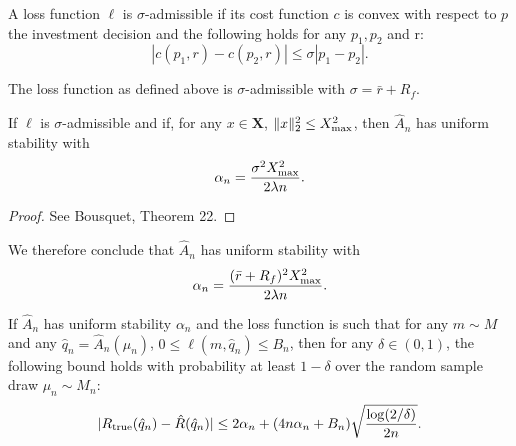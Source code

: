 \documentclass[11pt]{article}
\begin{document}
\begin{deff}
  A loss function $\ell$ is $\sigma$-admissible if its cost function $c$ is convex with
  respect to $p$ the investment decision and the following holds for any $p_1,p_2$ and r:
  \begin{equation*}
    |c(p_1,r) - c(p_2,r)| \leq \sigma|p_1-p_2|.
  \end{equation*}
\end{deff}

\begin{rem}
  The loss function as defined above is $\sigma$-admissible with $\sigma=\bar r+R_f$.
\end{rem}

\begin{thm}
  If $\ell$ is $\sigma$-admissible and if, for any $x\in\bm X$, $\|x\|_2^2\leq X_{\max}^2$,
  then $\hat A_n$ has uniform stability with
  \begin{equation*}
    \alpha_n = \frac{\sigma^2 X_{\max}^2}{2\lambda n}.
  \end{equation*}
\end{thm}

\begin{proof}
  See Bousquet, Theorem 22. 
\end{proof}

We therefore conclude that $\hat A_n$ has uniform stability with
\begin{equation*}
  \alpha_n = \frac{(\bar r+R_f)^2X_{\max}^2}{2\lambda n}.
\end{equation*}

\begin{thm}
  If $\hat A_n$ has uniform stability $\alpha_n$ and the loss function is such that for
  any $m\sim M$ and any $\hat q_n=\hat A_n(\mu_n)$, $0\leq \ell(m,\hat q_n)\leq B_n$, then
  for any $\delta\in(0,1)$, the following bound holds with probability at least $1-\delta$
  over the random sample draw $\mu_n\sim M_n$:
  \begin{equation*}
    |R_{\mathrm{true}}({\hat q}_n) - \hat R({\hat q}_n)| \leq 2\alpha_n + (4n\alpha_n + B_n)\sqrt{\frac{\log(2/\delta)}{2n}}.
  \end{equation*}
\end{thm}

\end{document}
